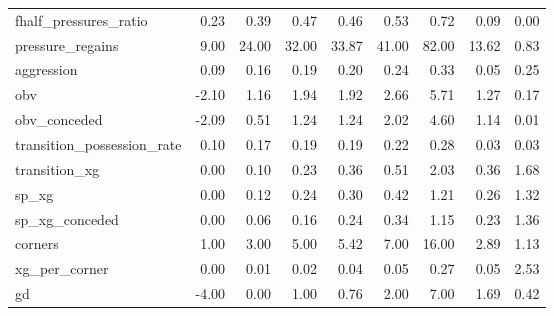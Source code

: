 \begin{table}[H]
{\begin{tabular}{lrrrrrrrr}
fhalf\_pressures\_ratio & 0.23 & 0.39 & 0.47 & 0.46 & 0.53 & 0.72 & 0.09 & 0.00 \\
pressure\_regains & 9.00 & 24.00 & 32.00 & 33.87 & 41.00 & 82.00 & 13.62 & 0.83 \\
aggression & 0.09 & 0.16 & 0.19 & 0.20 & 0.24 & 0.33 & 0.05 & 0.25 \\
obv & -2.10 & 1.16 & 1.94 & 1.92 & 2.66 & 5.71 & 1.27 & 0.17 \\
obv\_conceded & -2.09 & 0.51 & 1.24 & 1.24 & 2.02 & 4.60 & 1.14 & 0.01 \\
transition\_possession\_rate & 0.10 & 0.17 & 0.19 & 0.19 & 0.22 & 0.28 & 0.03 & 0.03 \\
transition\_xg & 0.00 & 0.10 & 0.23 & 0.36 & 0.51 & 2.03 & 0.36 & 1.68 \\
sp\_xg & 0.00 & 0.12 & 0.24 & 0.30 & 0.42 & 1.21 & 0.26 & 1.32 \\
sp\_xg\_conceded & 0.00 & 0.06 & 0.16 & 0.24 & 0.34 & 1.15 & 0.23 & 1.36 \\
corners & 1.00 & 3.00 & 5.00 & 5.42 & 7.00 & 16.00 & 2.89 & 1.13 \\
xg\_per\_corner & 0.00 & 0.01 & 0.02 & 0.04 & 0.05 & 0.27 & 0.05 & 2.53 \\
gd & -4.00 & 0.00 & 1.00 & 0.76 & 2.00 & 7.00 & 1.69 & 0.42 \\
\bottomrule
\end{tabular}}
\end{table}